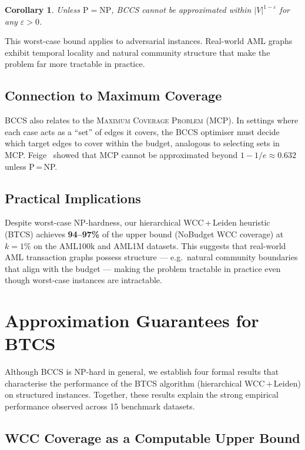\documentclass[11pt]{article}
\newtheorem{corollary}[theorem]{Corollary}
\begin{document}
\begin{corollary}\label{cor:inapprox}
Unless $\mathrm{P}=\mathrm{NP}$, BCCS cannot be approximated within
$|V|^{1-\varepsilon}$ for any $\varepsilon>0$.
\end{corollary}

This worst-case bound applies to adversarial instances.
Real-world AML graphs exhibit temporal locality and natural community
structure that make the problem far more tractable in practice.

\subsection{Connection to Maximum Coverage}

BCCS also relates to the \textsc{Maximum Coverage Problem} (MCP).
In settings where each case acts as a ``set'' of edges it covers,
the BCCS optimiser must decide which target edges to cover within
the budget, analogous to selecting sets in MCP.
Feige~\cite{feige1998} showed that MCP cannot be approximated beyond
$1-1/e\approx 0.632$ unless P\,=\,NP.

\subsection{Practical Implications}

Despite worst-case NP-hardness, our hierarchical WCC\,+\,Leiden
heuristic (BTCS) achieves \textbf{94--97\%} of the upper bound
(NoBudget WCC coverage) at $k=1\%$ on the AML100k and AML1M datasets.
This suggests that real-world AML transaction graphs possess structure
--- e.g.\ natural community boundaries that align with the budget ---
making the problem tractable in practice even though worst-case
instances are intractable.

\section{Approximation Guarantees for BTCS}

Although BCCS is NP-hard in general, we establish four formal results
that characterise the performance of the BTCS algorithm (hierarchical
WCC\,+\,Leiden) on structured instances.  Together, these results
explain the strong empirical performance observed across 15 benchmark
datasets.

\subsection{WCC Coverage as a Computable Upper Bound}
\end{document}
